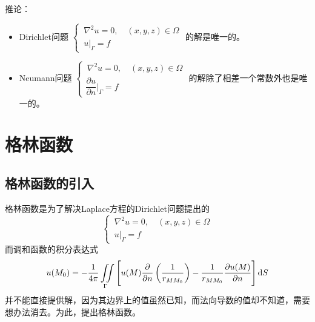 推论：
\begin{itemize}
	\item Dirichlet问题
	$\begin{cases}
		\, \nabla^2 u = 0, \quad (x,y,z) \in \Omega\\
		\, u\big|_{\Gamma} = f
	\end{cases}$
	的解是唯一的。
	
	\item Neumann问题
	$
	\begin{cases}
		\, \nabla^2 u = 0, \quad (x,y,z) \in \Omega\\
		\dfrac{\partial u}{\partial n}\Bigg|_{\Gamma} = f
	\end{cases}
	$
	的解除了相差一个常数外也是唯一的。
\end{itemize}

\section{格林函数}
\subsection{格林函数的引入}
格林函数是为了解决Laplace方程的Dirichlet问题提出的
\begin{equation}
	\begin{cases}
		\, \nabla^2 u = 0, \quad (x,y,z) \in \Omega\\
		\, u\big|_{\Gamma} = f
	\end{cases}
\end{equation}
而调和函数的积分表达式
\begin{equation*}
	u(M_0) = - \dfrac{1}{4\pi} \iint\limits_{\Gamma}\Bigg[u(M)\dfrac{\partial }{\partial n} \left(\dfrac{1}{r_{MM_0}}\right) - \dfrac{1}{r_{MM_0}}\dfrac{\partial u(M)}{\partial n}\Bigg]\, {\rm{d}} S
\end{equation*}
并不能直接提供解，因为其边界上的值虽然已知，而法向导数的值却不知道，需要想办法消去。为此，提出格林函数。

